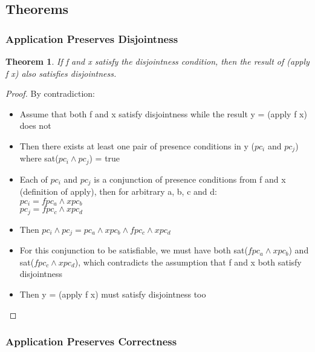 \documentclass[10pt,conference]{IEEEtran}
\begin{document}

\subsection{Theorems}

\subsubsection{Application Preserves Disjointness}

\newtheorem{th1}{Theorem}
\begin{th1}
If f and x satisfy the disjointness condition, then the result of (apply f x) also satisfies disjointness.
\end{th1}

\begin{proof}

By contradiction:

\begin{itemize}
\item Assume that both f and x satisfy disjointness while the result y = (apply f x) does not
\item Then there exists at least one pair of presence conditions in y ($pc_i$ and $pc_j$) where sat($pc_i \wedge pc_j$) = true
\item Each of $pc_i$ and $pc_j$ is a conjunction of presence conditions from f and x (definition of apply), then for arbitrary a, b, c and d: \\
               $pc_i = fpc_a \wedge xpc_b$ \\
               $pc_j = fpc_c \wedge xpc_d$
\item Then $pc_i \wedge pc_j = pc_a \wedge xpc_b \wedge fpc_c \wedge xpc_d$
\item For this conjunction to be satisfiable, we must have both sat($fpc_a \wedge xpc_b$) and sat($fpc_c \wedge xpc_d$), which contradicts the assumption that f and x both satisfy disjointness
\item Then y = (apply f x) must satisfy disjointness too
\end{itemize}

\end{proof}

\subsubsection{Application Preserves Correctness}
\end{document}
